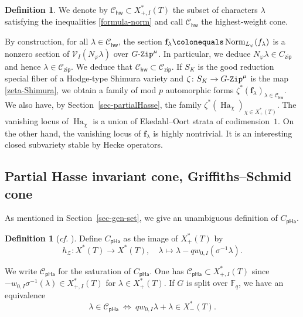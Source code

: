 \documentclass[11pt]{amsart}
\numberwithin{equation}{section}
\theoremstyle{definition}
\newtheorem{definition}[theorem]{Definition}
\theoremstyle{remark}
\newcommand{\GZip}{\mathop{\text{$G$-{\tt Zip}}}\nolimits}
\newcommand{\pha}{\mathsf{pHa}}
\newcommand{\zipsf}{\mathsf{zip}}
\newcommand{\hwsf}{\mathsf{hw}}
\newcommand{\Ccal}{{\mathcal C}}
\newcommand{\Vcal}{{\mathcal V}}
\newcommand{\Zcal}{{\mathcal Z}}
\newcommand{\FF}{\mathbb{F}}
\DeclareMathOperator{\Ha}{Ha}
\DeclareMathOperator{\Norm}{Norm}
\newcommand{\lra}{\longrightarrow}
\begin{document}
\begin{definition}
We denote by $\Ccal_{\hwsf}\subset X_{+,I}^*(T)$ the subset of characters $\lambda$ satisfying the inequalities \eqref{formula-norm} and call $\Ccal_{\hwsf}$ the highest-weight cone.
\end{definition}

By construction, for all $\lambda\in \Ccal_{\hwsf}$, the section $\mathbf{f}_{\lambda}\colonequals \Norm_{L_\varphi}(f_\lambda)$ is a nonzero section of $\Vcal_I(N_\varphi\lambda)$ over $\GZip^\mu$. In particular, we deduce $N_\varphi\lambda\in C_{\zipsf}$ and hence $\lambda \in \Ccal_{\zipsf}$. We deduce that $\Ccal_{\hwsf}\subset \Ccal_{\zipsf}$. If $S_K$ is the good reduction special fiber of a Hodge-type Shimura variety and $\zeta\colon S_K\to \GZip^\mu$ is the map \eqref{zeta-Shimura}, we obtain a family of mod $p$ automorphic forms $\zeta^*(\mathbf{f}_{\lambda})_{\lambda\in \Ccal_{\hwsf}}$. We also have, by Section~\ref{sec-partialHasse}, the family $\zeta^*(\Ha_{\chi})_{\chi\in X^*_{+}(T)}$. The vanishing locus of $\Ha_{\chi}$ is a union of Ekedahl--Oort strata of codimension~$1$. On the other hand, the vanishing locus of $\mathbf{f}_{\lambda}$ is highly nontrivial. It is an interesting closed subvariety stable by Hecke operators.

\subsection{Partial Hasse invariant cone, Griffiths--Schmid cone}
As mentioned in Section~\ref{sec-gen-set}, 
we give an unambiguous definition of $C_{\pha}$.

\begin{definition}[\textit{cf.} {\cite[Definition 1.7.1]{Koskivirta-automforms-GZip}}] \label{definition-CHasse}
Define $C_{\pha}$ as the image of $X^*_+(T)$ by
\begin{equation}\label{equ-maph}
h_{\Zcal}\colon X^*(T)\lra X^*(T), \quad \lambda \longmapsto \lambda-q w_{0,I} (\sigma^{-1} \lambda).
\end{equation}
\end{definition}

We write $\Ccal_{\pha}$ for the saturation of $C_{\pha}$. One has $\Ccal_{\pha}\subset X_{+,I}^*(T)$ since $- w_{0,I} \sigma^{-1}(\lambda)\in X_{+,I}^*(T)$ for $\lambda\in X^*_+(T)$. 
If $G$ is split over $\FF_q$, we have an equivalence
\begin{equation}\label{equivSbt}
\lambda\in  \Ccal_{\pha}  \ \Longleftrightarrow \ q w_{0,I}\lambda+\lambda \in X_-^*(T).
\end{equation}
\end{document}
